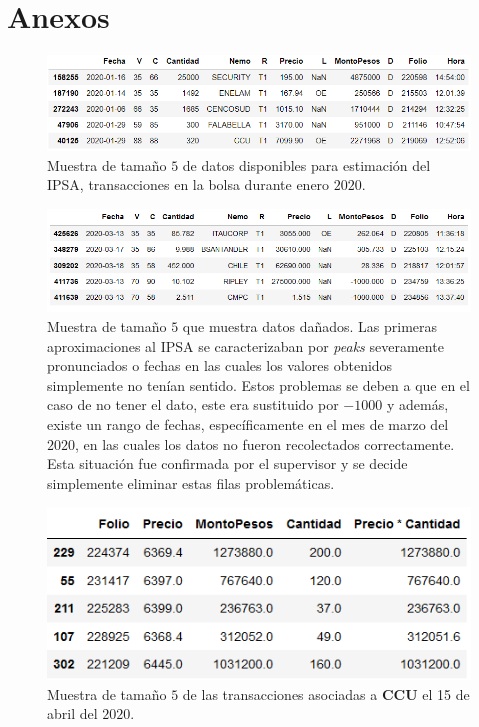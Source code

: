 \documentclass{article}
\begin{document}
\section{Anexos}
\begin{figure}[H]
	\centering
	\includegraphics[scale=.5]{imgs/transacciones_RV_data.png}
	\caption{Muestra de tamaño $5$ de datos disponibles para estimación del IPSA, transacciones en la bolsa durante enero $2020$.}
	\label{fig:trans}
\end{figure}
\begin{figure}[H]
	\centering
	\includegraphics[scale=.5]{imgs/muestra_danada.png}
	\caption{Muestra de tamaño $5$ que muestra datos dañados. Las primeras aproximaciones al IPSA se caracterizaban por \textit{peaks} severamente pronunciados o fechas en las cuales los valores obtenidos simplemente no tenían sentido. Estos problemas se deben a que en el caso de no tener el dato, este era sustituido por $-1000$ y además, existe un rango de fechas, específicamente en el mes de marzo del $2020$, en las cuales los datos no fueron recolectados correctamente. Esta situación fue confirmada por el supervisor y se decide simplemente eliminar estas filas problemáticas.}
	\label{fig:danados}
\end{figure}
\begin{figure}[H]
	\centering
	\includegraphics[scale=.5]{imgs/ccu_abril.png}
	\caption{Muestra de tamaño $5$ de las transacciones asociadas a \textbf{CCU} el 15 de abril del $2020$.}
	\label{fig:ccu_abril}
\end{figure}
\end{document}

